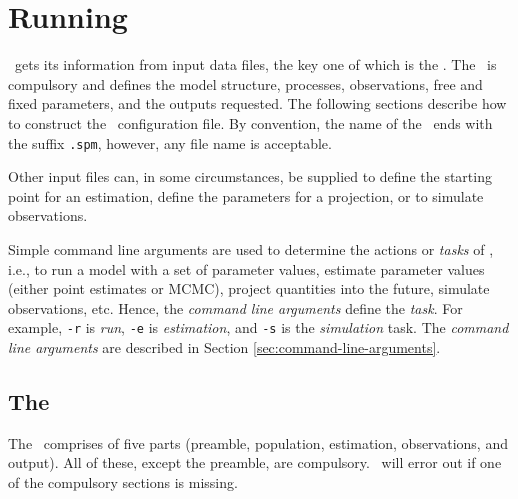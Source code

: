 \section{Running \SPM\label{sec:running-spm}}

\SPM\ gets its information from input data files, the key one of which is the \config{}. The \config\ is compulsory and defines the model structure, processes, observations, free and fixed parameters, and the outputs requested. The following sections  describe how to construct the \SPM\ configuration file. By convention, the name of the \config\ ends with the suffix \texttt{.spm}, however, any file name is acceptable.

Other input files can, in some circumstances, be supplied to define the starting point for an estimation, define the parameters for a projection, or to simulate observations.  

Simple command line arguments are used to determine the actions or \emph{tasks} of \SPM, i.e., to run a model with a set of parameter values, estimate parameter values (either point estimates or MCMC), project quantities into the future, simulate observations, etc. Hence, the \emph{command line arguments} define the \emph{task}. For example, \texttt{-r} is \emph{run}, \texttt{-e} is \emph{estimation}, and \texttt{-s} is the \emph{simulation} task. The \emph{command line arguments} are described in Section \ref{sec:command-line-arguments}.

\subsection{The \config\label{sec:config-files}}

The \config\ comprises of five parts (preamble, population, estimation, observations, and output). All of these, except the preamble, are compulsory. \SPM\ will error out if one of the compulsory sections is missing.

